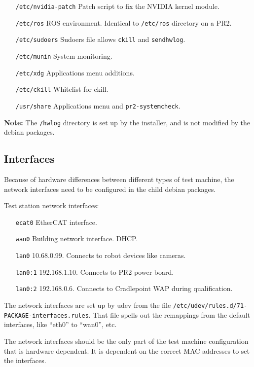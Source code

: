 \documentclass[11pt]{book}
\begin{document}
\begin{itemize}
\item [\texttt{/etc/nvidia-patch}] Patch script to fix the NVIDIA kernel module.
\item [\texttt{/etc/ros}] ROS environment. Identical to \texttt{/etc/ros} directory on a PR2.
\item [\texttt{/etc/sudoers}] Sudoers file allows \texttt{ckill} and \texttt{sendhwlog}.
\item [\texttt{/etc/munin}] System monitoring.
\item [\texttt{/etc/xdg}] Applications menu additions.
\item [\texttt{/etc/ckill}] Whitelist for ckill.
\item [\texttt{/usr/share}] Applications menu and \texttt{pr2-systemcheck}.
\end{itemize}

{\bf Note:} The \texttt{/hwlog} directory is set up by the installer, and is not modified by the debian packages.

\subsection{Interfaces}

Because of hardware differences between different types of test machine, the network interfaces need to be configured in the child debian packages.

Test station network interfaces:
\begin{itemize}
\item [\texttt{ecat0}] EtherCAT interface.
\item [\texttt{wan0}] Building network interface. DHCP.
\item [\texttt{lan0}] 10.68.0.99. Connects to robot devices like cameras.
\item [\texttt{lan0:1}] 192.168.1.10. Connects to PR2 power board.
\item [\texttt{lan0:2}] 192.168.0.6. Connects to Cradlepoint WAP during qualification.
\end{itemize}

The network interfaces are set up by udev from the file \texttt{/etc/udev/rules.d/71-PACKAGE-interfaces.rules}. That file spells out the remappings from the default interfaces, like ``eth0'' to ``wan0'', etc.

The network interfaces should be the only part of the test machine configuration that is hardware dependent. It is dependent on the correct MAC addresses to set the interfaces.
\end{document}
